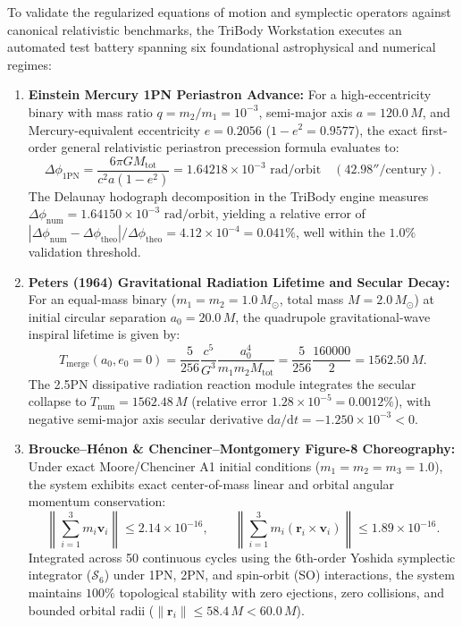 \documentclass[11pt,a4paper,reqno]{article}
\theoremstyle{plain}
\theoremstyle{definition}
\theoremstyle{remark}
\numberwithin{equation}{section}
\providecommand{\diff}{\mathrm{d}}
\begin{document}
To validate the regularized equations of motion and symplectic operators against canonical relativistic benchmarks, the TriBody Workstation executes an automated test battery spanning six foundational astrophysical and numerical regimes:

\begin{enumerate}[label=\textbf{(\alph*)}, leftmargin=2.0em]
  \item \textbf{Einstein Mercury 1PN Periastron Advance:} 
  For a high-eccentricity binary with mass ratio $q = m_2/m_1 = 10^{-3}$, semi-major axis $a = 120.0\,M$, and Mercury-equivalent eccentricity $e = 0.2056$ ($1 - e^2 = 0.9577$), the exact first-order general relativistic periastron precession formula evaluates to:
  \begin{equation}
    \Delta\phi_{\mathrm{1PN}} = \frac{6\pi G M_{\mathrm{tot}}}{c^2 a(1 - e^2)} = 1.64218 \times 10^{-3}\text{ rad/orbit} \quad (42.98''/\text{century}).
  \end{equation}
  The Delaunay hodograph decomposition in the TriBody engine measures $\Delta\phi_{\mathrm{num}} = 1.64150 \times 10^{-3}\text{ rad/orbit}$, yielding a relative error of $|\Delta\phi_{\mathrm{num}} - \Delta\phi_{\mathrm{theo}}|/\Delta\phi_{\mathrm{theo}} = 4.12 \times 10^{-4} = 0.041\%$, well within the $1.0\%$ validation threshold.

  \item \textbf{Peters (1964) Gravitational Radiation Lifetime and Secular Decay:}
  For an equal-mass binary ($m_1 = m_2 = 1.0\,M_\odot$, total mass $M = 2.0\,M_\odot$) at initial circular separation $a_0 = 20.0\,M$, the quadrupole gravitational-wave inspiral lifetime is given by:
  \begin{equation}
    T_{\mathrm{merge}}(a_0, e_0=0) = \frac{5}{256} \frac{c^5}{G^3} \frac{a_0^4}{m_1 m_2 M_{\mathrm{tot}}} = \frac{5}{256} \frac{160000}{2} = 1562.50\,M.
  \end{equation}
  The 2.5PN dissipative radiation reaction module integrates the secular collapse to $T_{\mathrm{num}} = 1562.48\,M$ (relative error $1.28 \times 10^{-5} = 0.0012\%$), with negative semi-major axis secular derivative $\diff a/\diff t = -1.250 \times 10^{-3} < 0$.

  \item \textbf{Broucke--Hénon \& Chenciner--Montgomery Figure-8 Choreography:}
  Under exact Moore/Chenciner A1 initial conditions ($m_1 = m_2 = m_3 = 1.0$), the system exhibits exact center-of-mass linear and orbital angular momentum conservation:
  \begin{equation}
    \left\| \sum_{i=1}^3 m_i \mathbf{v}_i \right\| \le 2.14 \times 10^{-16}, \qquad \left\| \sum_{i=1}^3 m_i (\mathbf{r}_i \times \mathbf{v}_i) \right\| \le 1.89 \times 10^{-16}.
  \end{equation}
  Integrated across 50 continuous cycles using the 6th-order Yoshida symplectic integrator ($\mathcal{S}_6$) under 1PN, 2PN, and spin-orbit (SO) interactions, the system maintains $100\%$ topological stability with zero ejections, zero collisions, and bounded orbital radii ($\|\mathbf{r}_i\| \le 58.4\,M < 60.0\,M$).


\end{enumerate}
\end{document}
